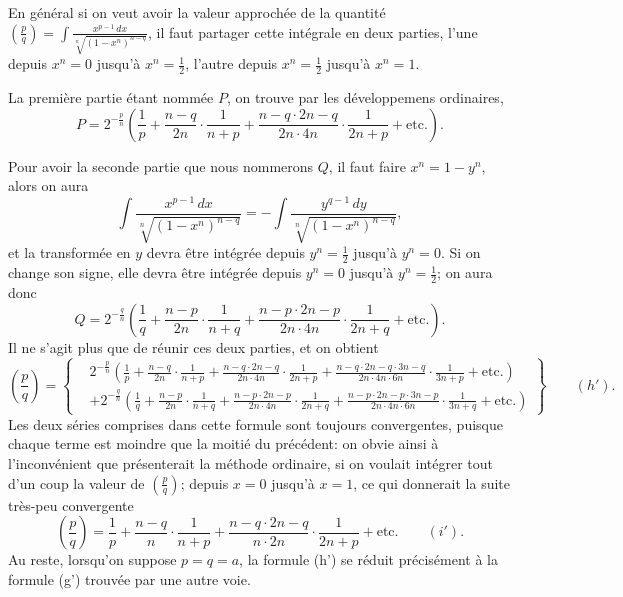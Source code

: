 \documentclass{article}
\begin{document}
En général si on veut avoir la valeur approchée de la quantité $\left(\frac{p}{q}\right)=\displaystyle\int\frac{x^{p-1}\,dx}{\sqrt[n]{(1-x^{n})^{n-q}}}$, il faut partager cette intégrale en deux parties, l'une depuis $x^{n}=0$ jusqu'à $x^{n}=\frac{1}{2}$, l'autre depuis $x^{n}=\frac{1}{2}$ jusqu'à $x^{n}=1$.

La première partie étant nommée $P$, on trouve par les développemens ordinaires,
\[ P=2^{-\frac{p}{n}}\left(\frac{1}{p}+\frac{n-q}{2n}\cdot\frac{1}{n+p}+\frac{n-q\cdot 2n-q}{2n\cdot 4n}\cdot\frac{1}{2n+p}+\text{etc.}\right). \]

Pour avoir la seconde partie que nous nommerons $Q$, il faut faire $x^{n}=1-y^{n}$, alors on aura
\[ \int\frac{x^{p-1}\,dx}{\sqrt[n]{(1-x^{n})^{n-q}}}=-\int\frac{y^{q-1}\,dy}{\sqrt[n]{(1-x^{n})^{n-q}}}, \]
et la transformée en $y$ devra être intégrée depuis $y^{n}=\frac{1}{2}$ jusqu'à $y^{n}=0$. Si on change son signe, elle devra être intégrée depuis $y^{n}=0$ jusqu'à $y^{n}=\frac{1}{2}$; on aura donc
\[ Q=2^{-\frac{q}{n}}\left(\frac{1}{q}+\frac{n-p}{2n}\cdot\frac{1}{n+q}+\frac{n-p\cdot 2n-p}{2n\cdot 4n}\cdot\frac{1}{2n+q}+\text{etc.}\right). \]
Il ne s'agit plus que de réunir ces deux parties, et on obtient
\[ \left(\frac{p}{q}\right)=\left\{\begin{aligned} &2^{-\frac{p}{n}}\left(\frac{1}{p}+\frac{n-q}{2n}\cdot\frac{1}{n+p}+\frac{n-q\cdot 2n-q}{2n\cdot 4n}\cdot\frac{1}{2n+p}+\frac{n-q\cdot 2n-q\cdot 3n-q}{2n\cdot 4n\cdot 6n}\cdot\frac{1}{3n+p}+\text{etc.}\right)\\ &+2^{-\frac{q}{n}}\left(\frac{1}{q}+\frac{n-p}{2n}\cdot\frac{1}{n+q}+\frac{n-p\cdot 2n-p}{2n\cdot 4n}\cdot\frac{1}{2n+q}+\frac{n-p\cdot 2n-p\cdot 3n-p}{2n\cdot 4n\cdot 6n}\cdot\frac{1}{3n+q}+\text{etc.}\right) \end{aligned}\right\}\qquad(h'). \]
Les deux séries comprises dans cette formule sont toujours convergentes, puisque chaque terme est moindre que la moitié du précédent: on obvie ainsi à l'inconvénient que présenterait la méthode ordinaire, si on voulait intégrer tout d'un coup la valeur de $\left(\frac{p}{q}\right)$; depuis $x=0$ jusqu'à $x=1$, ce qui donnerait la suite très-peu convergente
\[ \left(\frac{p}{q}\right)=\frac{1}{p}+\frac{n-q}{n}\cdot\frac{1}{n+p}+\frac{n-q\cdot 2n-q}{n\cdot 2n}\cdot\frac{1}{2n+p}+\text{etc.}\qquad(i'). \]
Au reste, lorsqu'on suppose $p=q=a$, la formule (h') se réduit précisément à la formule (g') trouvée par une autre voie.
\end{document}
